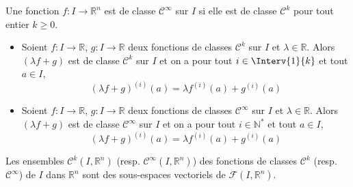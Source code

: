 \documentclass[a4paper,10pt]{report}
\begin{document}
\begin{defin} Une fonction $f : I \rightarrow \mathbb{R}^n$ est de classe $\mathcal{C}^{\infty}$ sur $I$ si elle est de classe $\mathcal{C}^k$ pour tout entier $k \geq 0$.
\end{defin}
%



\begin{prop} 
\begin{itemize}
\item Soient $f : I \rightarrow \mathbb{R}$, $g : I \rightarrow \mathbb{R}$ deux fonctions de classes $\mathcal{C}^k$ sur $I$ et $\lambda \in \mathbb{R}$. Alors $(\lambda f+g)$ est de classe $\mathcal{C}^k$ sur $I$ et on a pour tout $i \in  \Interv{1}{k}$ et tout $a \in I$,
$$ (\lambda f+g)^{(i)}(a) = \lambda f^{(i)}(a) + g^{(i)}(a) $$
\item  Soient $f : I \rightarrow \mathbb{R}$, $g : I \rightarrow \mathbb{R}$ deux fonctions de classes $\mathcal{C}^{\infty}$ sur $I$ et $\lambda \in \mathbb{R}$. Alors $(\lambda f+g)$ est de classe $\mathcal{C}^{\infty}$ sur $I$ et on a pour tout $i \in \mathbb{N}^*$ et tout $a \in I$,
$$ (\lambda f+g)^{(i)}(a) = \lambda f^{(i)}(a) + g^{(i)}(a) $$
\end{itemize}
\end{prop}

\begin{rem} Les ensembles $\mathcal{C}^k(I, \mathbb{R}^n)$ (resp. $\mathcal{C}^{\infty}(I, \mathbb{R}^n)$) des fonctions de classes $\mathcal{C}^k$ (resp. $\mathcal{C}^{\infty}$) de $I$ dans $\mathbb{R}^n$ sont des sous-espaces vectoriels de $\mathcal{F}(I, \mathbb{R}^n)$.
\end{rem}
\end{document}

